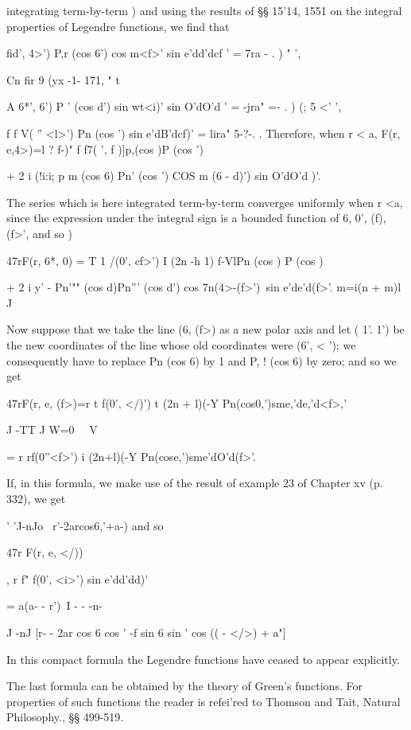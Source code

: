 %
%

integrating term-by-term ) and using the results of §§ 15'14,
1551 on the integral properties of Legendre functions, we find that

fid', 4>') P,r (cos 6') cos m<f>' sin e'dd'dcf ' = 7ra - . ) " ',

Cn fir 9 (yx -1- 171, " t

A 6*', 6') P ' (cos d') sin wt<i)' sin O'dO'd ' = -jra" =- . ) (; 5
<' ',

f f V( '' <l>') Pn (cos ') sin e'dB'dcf)' = lira" 5-?-. . Therefore,
when r < a, F(r, e,4>)=l ? f-)" f f7( ', f )]p,(cos )P (cos ')

+ 2 i (!i:i; p m (cos 6) Pn' (cos ') COS m (6 - d)') sin O'dO'd )'.

The series which is here integrated term-by-term converges uniformly
when r <a, since the expression under the integral sign is a bounded
function of 6, 0', (f), (f>', and so  )

47rF(r, 6*, 0) = T 1 /(0', cf>') I (2n -h 1) f-VlPn (cos ) P (cos )

+ 2 i y' - Pn'"" (cos d)Pn''' (cos d') cos 7n(4>-(f>')\ sin
e'de'd(f>'. m=i(n + m)l J

Now suppose that we take the line (6, (f>) as a new polar axis and let
( 1'. 1') be the new coordinates of the line whose old coordinates
were (6', < '); we consequently have to replace Pn (cos 6) by 1 and
P, ! (cos 6) by zero; and so we get

47rF(r, e, (f>)=r t f(0', </)') t (2n + l)(-Y
Pn(cos0,')sme,'de,'d<f>,'

J -TT J W=0 \ \ V

= r rf(0''<f>') i (2n+l)(-Y Pn(cose,')sme'dO'd(f>'.

If, in this formula, we make use of the result of example 23 of
Chapter xv (p. 332), we get

 ' 'J-nJo \ r'-2arcos6,'+a-) and so

47r F(r, e, </))

, r f" f(0', <i>') sin e'dd'dd)'

= a(a- - r')\ I - - -n-

J -nJ [r- - 2ar cos 6 cos ' -f sin 6 sin ' cos (( - </>) + a"]

In this compact formula the Legendre functions have ceased to appear
explicitly.

%
%

The last formula can be obtained by the theory of Green's functions.
For properties of such functions the reader is refei'red to Thomson
and Tait, Natural Philosophy., §§ 499-519.

